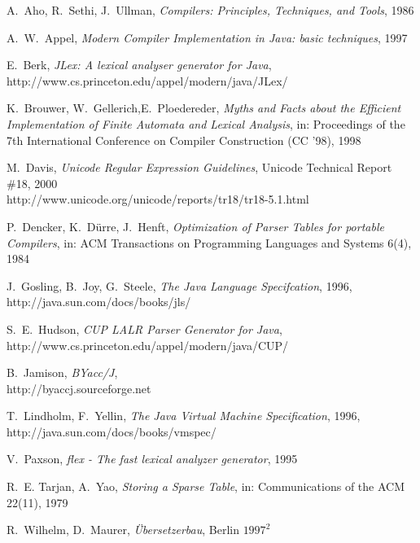 \documentclass[11pt]{scrartcl}
\newcommand{\trit}{\em}
\begin{document}
\newpage  
\begin{thebibliography}{[00]} 
\label{References} 

  A.~Aho, R.~Sethi, J.~Ullman, {\trit Compilers: Principles, Techniques, and Tools}, 1986


  A.~W.~Appel, {\trit Modern Compiler Implementation in Java: basic techniques}, 1997

 E.~Berk, {\trit JLex: A lexical analyser generator for Java},\\
                   {http://www.cs.princeton.edu/appel/modern/java/JLex/}


  K.~Brouwer, W.~Gellerich,E.~Ploedereder, 
  {\trit Myths and Facts about the Efficient Implementation of Finite Automata and Lexical Analysis}, 
  in: Proceedings of the 7th International Conference on Compiler Construction (CC '98), 1998

  M.~Davis, {\trit Unicode Regular Expression Guidelines}, Unicode Technical Report \#18, 2000\\ 
                    {http://www.unicode.org/unicode/reports/tr18/tr18-5.1.html}

 P.~Dencker, K.~D{\"u}rre, J.~Henft, {\trit Optimization of Parser Tables for portable Compilers}, 
 in: ACM Transactions on Programming Languages and Systems 6(4), 1984

  J.~Gosling, B.~Joy, G.~Steele, {\trit The Java Language Specifcation}, 1996,\\
                    {http://java.sun.com/docs/books/jls/}

  S.~E.~Hudson, {\trit CUP LALR Parser Generator for Java},\\  
  {http://www.cs.princeton.edu/appel/modern/java/CUP/}

  B.~Jamison, {\trit BYacc/J},\\
  {http://byaccj.sourceforge.net}
  
 T.~Lindholm, F.~Yellin, {\trit The Java Virtual Machine Specification}, 1996,\\
                   {http://java.sun.com/docs/books/vmspec/}
 
 V.~Paxson, {\trit flex - The fast lexical analyzer generator}, 1995

  R.~E. Tarjan, A.~Yao, {\trit Storing a Sparse Table}, in: Communications of the ACM 22(11), 1979 

  R.~Wilhelm, D.~Maurer, {\trit {\"U}bersetzerbau}, Berlin $1997^2$

\end{thebibliography}
\end{document}
